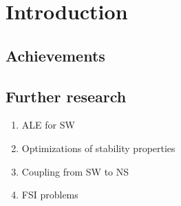 
\chapter{Introduction}
\label{chapter_introduction}




\section{Achievements}





\section{Further research}


\begin{enumerate}
    \item ALE for SW
    \item Optimizations of stability properties
    \item Coupling from SW to NS
    \item FSI problems
\end{enumerate}

